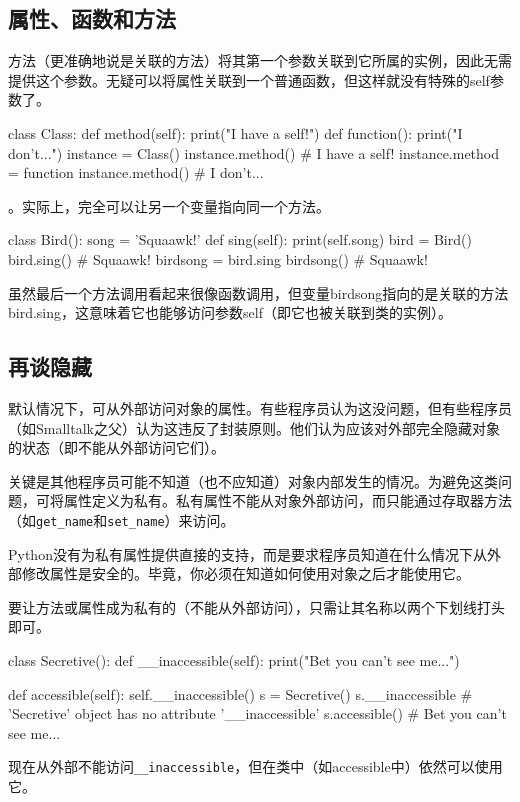 \subsection{属性、函数和方法}
方法（更准确地说是关联的方法）将其第一个参数关联到它所属的实例，因此无需提供这个参数。无疑可以将属性关联到一个普通函数，但这样就没有特殊的self参数了。

\begin{pyc}
class Class:
    def method(self):
        print("I have a self!")
def function():
    print("I don't...")
instance = Class()
instance.method()  # I have a self!
instance.method = function
instance.method()  # I don't...
\end{pyc}
。实际上，完全可以让另一个变量指向同一个方法。
\begin{pyc}
    class Bird():
    song = 'Squaawk!'
    def sing(self):
        print(self.song)
bird = Bird()
bird.sing()  # Squaawk!
birdsong = bird.sing
birdsong()  # Squaawk!
\end{pyc}
虽然最后一个方法调用看起来很像函数调用，但变量birdsong指向的是关联的方法bird.sing，这意味着它也能够访问参数self（即它也被关联到类的实例）。

\subsection{再谈隐藏}
默认情况下，可从外部访问对象的属性。有些程序员认为这没问题，但有些程序员（如Smalltalk之父）认为这违反了封装原则。他们认为应该对外部完全隐藏对象的状态（即不能从外部访问它们）。

关键是其他程序员可能不知道（也不应知道）对象内部发生的情况。为避免这类问题，可将属性定义为私有。私有属性不能从对象外部访问，而只能通过存取器方法（如\verb|get_name|和\verb|set_name|）来访问。

Python没有为私有属性提供直接的支持，而是要求程序员知道在什么情况下从外部修改属性是安全的。毕竟，你必须在知道如何使用对象之后才能使用它。

要让方法或属性成为私有的（不能从外部访问），只需让其名称以两个下划线打头即可。
\begin{pyc}
class Secretive():
    def __inaccessible(self):
        print("Bet you can't see me...")

    def accessible(self):
        self.__inaccessible()
s = Secretive()
s.__inaccessible  # 'Secretive' object has no attribute '__inaccessible'
s.accessible()  # Bet you can't see me...
\end{pyc}
现在从外部不能访问\verb|__inaccessible|，但在类中（如accessible中）依然可以使用它。

